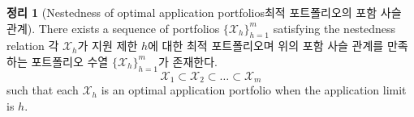 \documentclass[11pt]{article} %
\newtheorem{theorem}{Theorem}
\newtheorem{lemma}{Lemma}
\theoremstyle{definition}
\newtheorem{theorem}{정리}
\newtheorem{lemma}{기본 정리}
\theoremstyle{definition}
\begin{document}
%

\begin{theorem}[\ifen Nestedness of optimal application portfolios\else 최적 포트폴리오의 포함 사슬 관계\fi] \label{nestedapplication}
\ifen There exists a sequence of portfolios $\{\mathcal{X}_h\}_{h=1}^m$ satisfying the nestedness relation
\else  각 $\mathcal{X}_h$가 지원 제한 $h$에 대한 최적 포트폴리오며 위의 포함 사슬 관계를 만족하는 포트폴리오 수열  $\{\mathcal{X}_h\}_{h=1}^m$가 존재한다.\fi
\begin{equation}
\mathcal{X}_1 \subset \mathcal{X}_2\subset \dots \subset \mathcal{X}_m
\end{equation}
\ifen such that each $\mathcal{X}_h$ is an optimal application portfolio when the application limit is $h$.\fi
\end{theorem}
\end{document}
